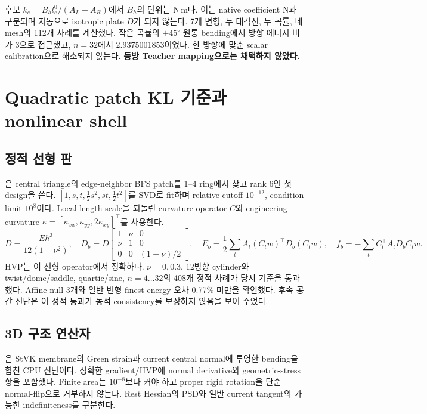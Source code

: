 \documentclass[10pt]{article}
\begin{document}
후보 \(k_e=B_hl_e^0/(A_L+A_R)\)에서 \(B_h\)의 단위는 N\,m다.
이는 native coefficient N과 구분되며 자동으로 isotropic plate \(D\)가 되지 않는다.
7개 변형, 두 대각선, 두 곡률, 네 mesh의 112개 사례를 계산했다.
작은 곡률의 \(\pm45^\circ\) 원통 bending에서 방향 에너지 비가 3으로 접근했고,
\(n=32\)에서 2.9375001853이었다. 한 방향에 맞춘 scalar calibration으로 해소되지 않는다.
\textbf{등방 Teacher mapping으로는 채택하지 않았다.}

\section{Quadratic patch KL 기준과 nonlinear shell}

\subsection{정적 선형 판}

은 central triangle의 edge-neighbor BFS patch를
1--4 ring에서 찾고 rank 6인 첫 design을 쓴다.
\([1,s,t,\tfrac12s^2,st,\tfrac12t^2]\)를 SVD로 fit하며 relative cutoff \(10^{-12}\),
condition limit \(10^8\)이다. Local length scale을 되돌린 curvature operator \(C\)와
engineering curvature \(\kappa=[\kappa_{xx},\kappa_{yy},2\kappa_{xy}]^\top\)를 사용한다.
\[
 D=\frac{Eh^3}{12(1-\nu^2)},\quad
 D_b=D\begin{bmatrix}1&\nu&0\\\nu&1&0\\0&0&(1-\nu)/2\end{bmatrix},\quad
 E_b=\frac12\sum_t A_t(C_tw)^\top D_b(C_tw),\quad
 f_b=-\sum_t C_t^\top A_tD_bC_tw.
\]
HVP는 이 선형 operator에서 정확하다. \(\nu=0,0.3\), 12방향 cylinder와 twist/dome/saddle,
quartic/sine, \(n=4\ldots32\)의 408개 정적 사례가 당시 기준을 통과했다.
Affine null 3개와 일반 변형 finest energy 오차 0.77\% 미만을 확인했다.
후속 공간 진단은 이 정적 통과가 동적 consistency를 보장하지 않음을 보여 주었다.

\subsection{3D 구조 연산자}

은 StVK membrane의 Green strain과
current central normal에 투영한 bending을 합친 CPU 진단이다.
정확한 gradient/HVP에 normal derivative와 geometric-stress 항을 포함했다.
Finite area는 \(10^{-8}\)보다 커야 하고 proper rigid rotation을 단순 normal-flip으로 거부하지 않는다.
Rest Hessian의 PSD와 일반 current tangent의 가능한 indefiniteness를 구분한다.
\end{document}
